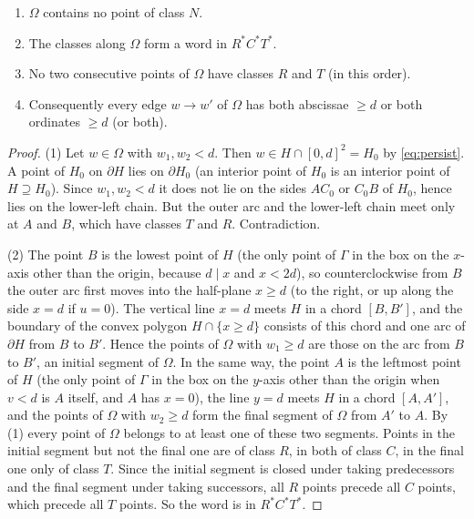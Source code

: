 \begin{lemma}\label{lem:omega}
\begin{enumerate}
\item $\Omega$ contains no point of class $N$.
\item The classes along $\Omega$ form a word in $R^*C^*T^*$.
\item No two consecutive points of $\Omega$ have classes $R$ and $T$ (in this order).
\item Consequently every edge $w\to w'$ of $\Omega$ has both abscissae $\ge d$ or both ordinates $\ge d$ (or both).
\end{enumerate}
\end{lemma}
\begin{proof}
(1) Let $w\in\Omega$ with $w_1,w_2<d$. Then $w\in H\cap[0,d]^2=H_0$ by \eqref{eq:persist}. A point of $H_0$ on $\partial H$ lies on $\partial H_0$ (an interior point of $H_0$ is an interior point of $H\supseteq H_0$). Since $w_1,w_2<d$ it does not lie on the sides $AC_0$ or $C_0B$ of $H_0$, hence lies on the lower-left chain. But the outer arc and the lower-left chain meet only at $A$ and $B$, which have classes $T$ and $R$. Contradiction.

(2) The point $B$ is the lowest point of $H$ (the only point of $\Gamma$ in the box on the $x$-axis other than the origin, because $d\mid x$ and $x<2d$), so counterclockwise from $B$ the outer arc first moves into the half-plane $x\ge d$ (to the right, or up along the side $x=d$ if $u=0$). The vertical line $x=d$ meets $H$ in a chord $[B,B']$, and the boundary of the convex polygon $H\cap\{x\ge d\}$ consists of this chord and one arc of $\partial H$ from $B$ to $B'$. Hence the points of $\Omega$ with $w_1\ge d$ are those on the arc from $B$ to $B'$, an initial segment of $\Omega$. In the same way, the point $A$ is the leftmost point of $H$ (the only point of $\Gamma$ in the box on the $y$-axis other than the origin when $v<d$ is $A$ itself, and $A$ has $x=0$), the line $y=d$ meets $H$ in a chord $[A,A']$, and the points of $\Omega$ with $w_2\ge d$ form the final segment of $\Omega$ from $A'$ to $A$. By (1) every point of $\Omega$ belongs to at least one of these two segments. Points in the initial segment but not the final one are of class $R$, in both of class $C$, in the final one only of class $T$. Since the initial segment is closed under taking predecessors and the final segment under taking successors, all $R$ points precede all $C$ points, which precede all $T$ points. So the word is in $R^*C^*T^*$.


\end{proof}
